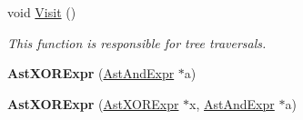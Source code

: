 \begin{DoxyCompactItemize}
\item 
void \hyperlink{classAstXORExpr_a6742a6024309a1359fe029204ca50c4f}{Visit} ()
\begin{DoxyCompactList}\small\item\em This function is responsible for tree traversals. \end{DoxyCompactList}\item 
\hypertarget{classAstXORExpr_a04ca42d403c3e4d69a0b9c6e22aff25b}{{\bfseries Ast\-X\-O\-R\-Expr} (\hyperlink{classAstAndExpr}{Ast\-And\-Expr} $\ast$a)}\label{classAstXORExpr_a04ca42d403c3e4d69a0b9c6e22aff25b}

\item 
\hypertarget{classAstXORExpr_a1481a0957bc4aee1819caa848f2f5a2d}{{\bfseries Ast\-X\-O\-R\-Expr} (\hyperlink{classAstXORExpr}{Ast\-X\-O\-R\-Expr} $\ast$x, \hyperlink{classAstAndExpr}{Ast\-And\-Expr} $\ast$a)}\label{classAstXORExpr_a1481a0957bc4aee1819caa848f2f5a2d}


\end{DoxyCompactItemize}
